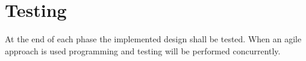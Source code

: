 \documentclass[]{IEEEtran}
\begin{document}
	
\mbox{} \\
\\\\\\\\\\\\\\\\\\\\\\\\\\\\\\\\\\\\\\\\\\\\\\\\\\\\\\\\\\
\\\\\\\\\\\\\\
	
	\section{Testing}
	
	At the end of each phase the implemented design shall be tested. When an agile approach is used programming and testing will be performed concurrently.
	
\end{document}
